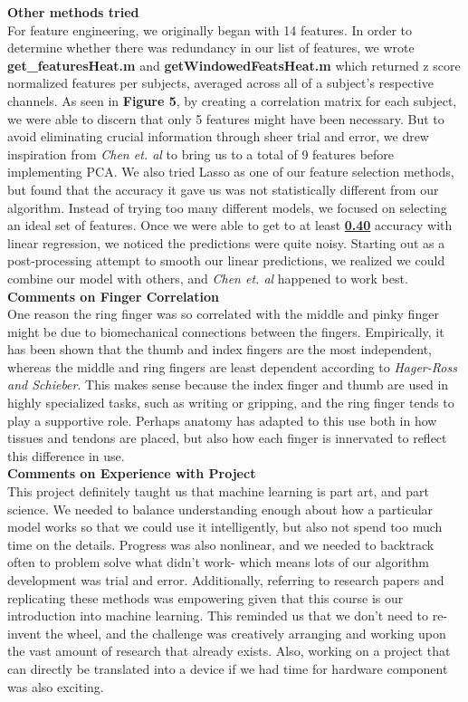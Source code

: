\documentclass{article}
\begin{document}
    \textbf{Other methods tried}\\
    For feature engineering, we originally began with 14 features. In order to determine whether there was redundancy in our list of features, we wrote \textbf{get\_featuresHeat.m} and \textbf{getWindowedFeatsHeat.m} which returned z score normalized features per subjects, averaged across all of a subject’s respective channels. As seen in \textbf{Figure 5}, by creating a correlation matrix for each subject, we were able to discern that only 5 features might have been necessary. But to avoid eliminating crucial information through sheer trial and error, we drew inspiration from \textit{Chen et. al} to bring us to a total of 9 features before implementing PCA. We also tried Lasso as one of our feature selection methods, but found that the accuracy it gave us was not statistically different from our algorithm. Instead of trying too many different models, we focused on selecting an ideal set of features. Once we were able to get to at least \underline{\textbf{0.40}} accuracy with linear regression, we noticed the predictions were quite noisy. Starting out as a post-processing attempt to smooth our linear predictions, we realized we could combine our model with others, and \textit{Chen et. al} happened to work best.\\
    
\textbf{Comments on Finger Correlation}\\
One reason the ring finger was so correlated with the middle and pinky finger might be due to biomechanical connections between the fingers. Empirically, it has been shown that the thumb and index fingers are the most independent, whereas the middle and ring fingers are least dependent according to \textit{Hager-Ross and Schieber}. This makes sense because the index finger and thumb are used in highly specialized tasks, such as writing or gripping, and the ring finger tends to play a supportive role. Perhaps anatomy has adapted to this use both in how tissues and tendons are placed, but also how each finger is innervated to reflect this difference in use.\\

\textbf{Comments on Experience with Project}\\ 
This project definitely taught us that machine learning is part art, and part science. We needed to balance understanding enough about how a particular model works so that we could use it intelligently, but also not spend too much time on the details. Progress was also nonlinear, and we needed to backtrack often to problem solve what didn’t work- which means lots of our algorithm development was trial and error. Additionally, referring to research papers and replicating these methods was empowering given that this course is our introduction into machine learning. This reminded us that we don’t need to re-invent the wheel, and the challenge was creatively arranging and working upon the vast amount of research that already exists. Also, working on a project that can directly be translated into a device if we had time for hardware component was also exciting.\\
\end{document}

